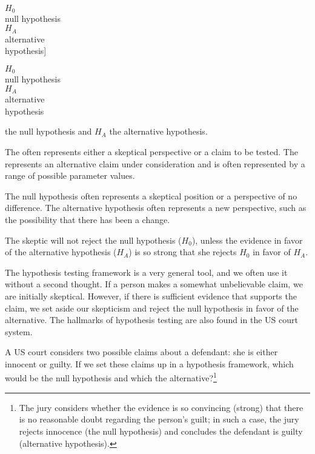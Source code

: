$H_0$\\\footnotesize null hypothesis\vspace{3mm}\\\normalsize $H_A$\\\footnotesize alternative\\ hypothesis]{\raggedright\vspace{6mm}

$H_0$\\\footnotesize null hypothesis\vspace{3mm}\\\normalsize $H_A$\\\footnotesize alternative\\ hypothesis} the null hypothesis and $H_A$ the alternative hypothesis.

\begin{termBox}{
{\small The  often represents either a skeptical perspective or a claim to be tested. The  represents an alternative claim under consideration and is often represented by a range of possible parameter values.}}
\end{termBox}

The null hypothesis often represents a skeptical position or a perspective of no difference. The alternative hypothesis often represents a new perspective, such as the possibility that there has been a change. 

\begin{tipBox}{
The skeptic will not reject the null hypothesis ($H_0$), unless the evidence in favor of the alternative hypothesis ($H_A$) is so strong that she rejects $H_0$ in favor of $H_A$.}
\end{tipBox}

The hypothesis testing framework is a very general tool, and we often use it without a second thought. If a person makes a somewhat unbelievable claim, we are initially skeptical. However, if there is sufficient evidence that supports the claim, we set aside our skepticism and reject the null hypothesis in favor of the alternative. The hallmarks of hypothesis testing are also found in the US court system. 

\begin{exercise} \label{hypTestCourtExample}
A US court considers two possible claims about a defendant: she is either innocent or guilty. If we set these claims up in a hypothesis framework, which would be the null hypothesis and which the alternative?\footnote{The jury considers whether the evidence is so convincing (strong) that there is no reasonable doubt regarding the person's guilt; in such a case, the jury rejects innocence (the null hypothesis) and concludes the defendant is guilty (alternative hypothesis).}
\end{exercise}

